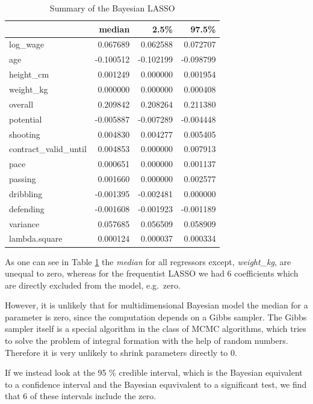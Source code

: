 \documentclass[12pt,a4paper]{article}
\begin{document}
\begin{table}

\caption{\label{tab:unnamed-chunk-4}\label{tab:sum_bay} Summary of the Bayesian LASSO }
\centering
\begin{tabular}[t]{lrrr}
\toprule
  & median & 2.5\% & 97.5\%\\
\midrule
\rowcolor{gray!6}  log\_wage & 0.067689 & 0.062588 & 0.072707\\
age & -0.100512 & -0.102199 & -0.098799\\
\rowcolor{gray!6}  height\_cm & 0.001249 & 0.000000 & 0.001954\\
weight\_kg & 0.000000 & 0.000000 & 0.000408\\
\rowcolor{gray!6}  overall & 0.209842 & 0.208264 & 0.211380\\
potential & -0.005887 & -0.007289 & -0.004448\\
\rowcolor{gray!6}  shooting & 0.004830 & 0.004277 & 0.005405\\
contract\_valid\_until & 0.004853 & 0.000000 & 0.007913\\
\rowcolor{gray!6}  pace & 0.000651 & 0.000000 & 0.001137\\
passing & 0.001660 & 0.000000 & 0.002577\\
\rowcolor{gray!6}  dribbling & -0.001395 & -0.002481 & 0.000000\\
defending & -0.001608 & -0.001923 & -0.001189\\
\rowcolor{gray!6}  variance & 0.057685 & 0.056509 & 0.058909\\
lambda.square & 0.000124 & 0.000037 & 0.000334\\
\bottomrule
\end{tabular}
\end{table}

As one can see in Table \ref{tab:sum_bay} the \emph{median} for all
regressors except, \emph{weight\_kg}, are unequal to zero, whereas for
the frequentist \ac{LASSO} we had 6 coefficients which are directly
excluded from the model, e.g.~zero.

However, it is unlikely that for multidimensional Bayesian model the
median for a parameter is zero, since the computation depends on a Gibbs
sampler. The Gibbs sampler itself is a special algorithm in the class of
MCMC algorithms, which tries to solve the problem of integral formation
with the help of random numbers. Therefore it is very unlikely to shrink
parameters directly to 0.

If we instead look at the 95 \% credible interval, which is the Bayesian
equivalent to a confidence interval and the Bayesian equvivalent to a
significant test, we find that 6 of these intervals include the zero.
\end{document}
